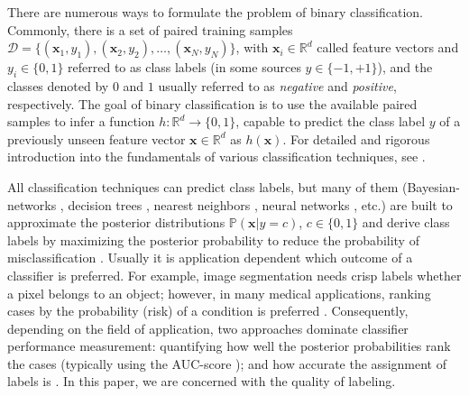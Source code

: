 \documentclass[5p, final]{elsarticle}
\begin{document}
There are numerous ways to formulate the problem of binary classification. Commonly, there is a set of paired training samples $\mathcal{D} = \lbrace(\mathbf{x}_1, y_1), (\mathbf{x}_2, y_2), \dots, (\mathbf{x}_N, y_N)\rbrace$, with $\mathbf{x}_i\in\mathbb{R}^d$ called feature vectors and $y_i\in\lbrace 0, 1\rbrace$ referred to as class labels (in some sources $y\in\lbrace -1, +1\rbrace$), and the classes denoted by $0$ and $1$ usually referred to as \emph{negative} and \emph{positive}, respectively. 
The goal of binary classification is to use the available paired samples to infer a function $h: \mathbb{R}^d\rightarrow \lbrace 0, 1\rbrace$, capable to predict the class label $y$ of a previously unseen feature vector $\mathbf{x}\in\mathbb{R}^d$ as $h(\mathbf{x})$. For detailed and rigorous introduction into the fundamentals of various classification techniques, see \cite{mlbook, mlbook2}. 

All classification techniques can predict class labels, but many of them (Bayesian-networks \cite{bayesiannetwork}, decision trees \cite{mlbook}, nearest neighbors \cite{mlbook}, neural networks \cite{mlbook}, etc.) are built to approximate the posterior distributions $\mathbb{P}(\mathbf{x}|y=c)$, $c\in\lbrace 0, 1\rbrace$ and derive class labels by maximizing the posterior probability to reduce the probability of misclassification \cite{bayesclassifier}. Usually it is application dependent which outcome of a classifier is preferred. For example, image segmentation \cite{segmentation} needs crisp labels whether a pixel belongs to an object; however, in many medical applications, ranking cases by the probability (risk) of a condition is preferred \cite{binclasranking}. Consequently, depending on the field of application, two approaches dominate classifier performance measurement: quantifying how well the posterior probabilities rank the cases (typically using the AUC-score \cite{aucsurvey}); and how accurate the assignment of labels is \cite{scores}. In this paper, we are concerned with the quality of labeling.
\end{document}
